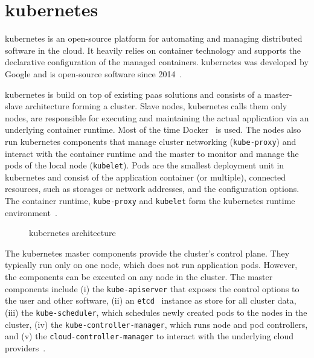 \section[Kubernetes]{\gls{kubernetes}}\label{sec:kubernetes}
  \Gls{kubernetes} is an open-source platform for automating and managing distributed software in the cloud.
  It heavily relies on container technology and supports the declarative configuration of the managed containers.
  \Gls{kubernetes} was developed by Google and is open-source software since 2014~\cite{kubernetes}.

  \Gls{kubernetes} is build on top of existing \gls{paas} solutions and consists of a master-slave architecture forming a cluster.
  Slave nodes, \gls{kubernetes} calls them only nodes, are responsible for executing and maintaining the actual application via an underlying container runtime.
  Most of the time Docker~\cite{docker} is used.
  The nodes also run \gls{kubernetes} components that manage cluster networking (\texttt{kube-proxy}) and interact with the container runtime and the master to monitor and manage the pods of the local node (\texttt{kubelet}).
  Pods are the smallest deployment unit in \gls{kubernetes} and consist of the application container (or multiple), connected resources, such as storages or network addresses, and the configuration options.
  The container runtime, \texttt{kube-proxy} and \texttt{kubelet} form the \gls{kubernetes} runtime environment~\cite{kubernetes}.

  \begin{figure}
    \centering
    \caption{\Gls{kubernetes} architecture}
    \label{fig:kubernetes-architecture}
  \end{figure}

  The \gls{kubernetes} master components provide the cluster's control plane.
  They typically run only on one node, which does not run application pods.
  However, the components can be executed on any node in the cluster.
  The master components include
  (i) the \texttt{kube-apiserver} that exposes the control options to the user and other software,
  (ii) an \texttt{etcd}~\cite{etcd} instance as store for all cluster data,
  (iii) the \texttt{kube-scheduler}, which schedules newly created pods to the nodes in the cluster,
  (iv) the \texttt{kube-controller-manager}, which runs node and pod controllers, and
  (v) the \texttt{cloud-controller-manager} to interact with the underlying cloud providers~\cite{kubernetes}.

